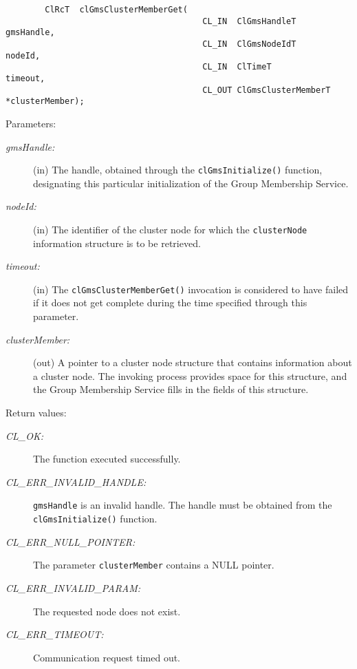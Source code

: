 \begin{flushleft}
\begin{Desc}
\footnotesize\begin{verbatim}        ClRcT  clGmsClusterMemberGet(
                                		CL_IN  ClGmsHandleT             gmsHandle,
                                		CL_IN  ClGmsNodeIdT             nodeId,
                                		CL_IN  ClTimeT                  timeout,
                                		CL_OUT ClGmsClusterMemberT     *clusterMember);
\end{verbatim}
\normalsize
\end{Desc}
\begin{Desc}
\item[Parameters:]
\begin{description}
\item[{\em gms\-Handle:}](in) The handle, obtained through the {\tt{clGmsInitialize()}} function, designating this particular initialization of the Group
Membership Service. 
\item[{\em node\-Id:}](in) The identifier of the cluster node for which the {\tt{cluster\-Node}} information structure is to be
retrieved. 
\item[{\em timeout:}](in) The {\tt{clGmsClusterMemberGet()}} invocation is considered to have failed if it
does not get complete during the time specified through this parameter. 
\item[{\em cluster\-Member:}](out) A pointer to a cluster node
structure that contains information about a cluster node. The invoking process provides space for this structure, and the Group Membership Service fills
in the fields of this structure.\end{description}
\end{Desc}
\begin{Desc}
\item[Return values:]
\begin{description}
\item[{\em CL\_\-OK:}]The function executed successfully.
\item[{\em CL\_\-ERR\_\-INVALID\_\-HANDLE:}]{\tt{gmsHandle}} is an invalid handle. The handle must be obtained from the
{\tt{clGmsInitialize()}} function.
\item[{\em CL\_\-ERR\_\-NULL\_\-POINTER:}]The parameter {\tt{cluster\-Member}} contains a NULL pointer.
\item[{\em CL\_\-ERR\_\-INVALID\_\-PARAM:}]The requested node does not exist.
\item[{\em CL\_\-ERR\_\-TIMEOUT:}]Communication request timed out.\end{description}

\end{Desc}
\end{flushleft}
